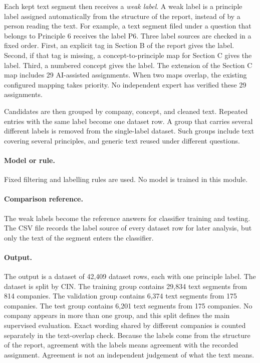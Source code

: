 Each kept text segment then receives a \emph{weak label}. A weak label is a principle label assigned automatically from the structure of the report, instead of by a person reading the text. For example, a text segment filed under a question that belongs to Principle 6 receives the label P6. Three label sources are checked in a fixed order. First, an explicit  tag in Section B of the report gives the label. Second, if that tag is missing, a concept-to-principle map for Section C gives the label. Third, a numbered  concept gives the label. The extension of the Section C map includes 29 AI-assisted assignments. When two maps overlap, the existing configured mapping takes priority. No independent expert has verified these 29 assignments.

Candidates are then grouped by company, concept, and cleaned text. Repeated entries with the same label become one dataset row. A group that carries several different labels is removed from the single-label dataset. Such groups include text covering several principles, and generic text reused under different questions.

\paragraph{Model or rule.} Fixed filtering and labelling rules are used. No model is trained in this module.

\paragraph{Comparison reference.} The weak labels become the reference answers for classifier training and testing. The CSV file records the label source of every dataset row for later analysis, but only the text of the segment enters the classifier.

\paragraph{Output.} The output is a dataset of 42,409 dataset rows, each with one principle label. The dataset is split by CIN. The training group contains 29,834 text segments from 814 companies. The validation group contains 6,374 text segments from 175 companies. The test group contains 6,201 text segments from 175 companies. No company appears in more than one group, and this split defines the main supervised evaluation. Exact wording shared by different companies is counted separately in the text-overlap check. Because the labels come from the structure of the report, agreement with the labels means agreement with the recorded assignment. Agreement is not an independent judgement of what the text means.


